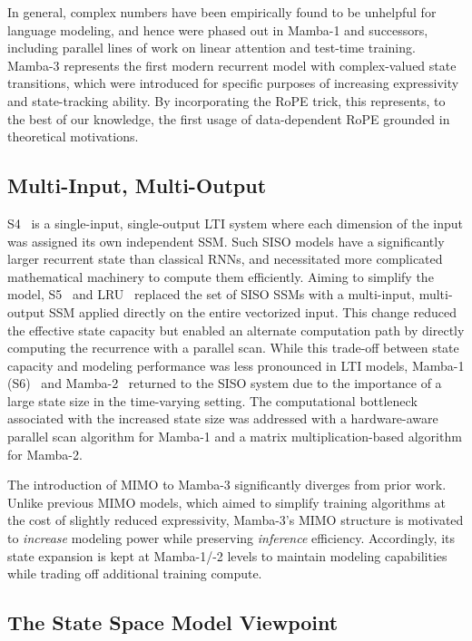 \documentclass{article}
\newcommand{\citep}{\parencite}
\theoremstyle{plain}
\theoremstyle{definition}
\theoremstyle{remark}
\begin{document}
In general, complex numbers have been empirically found to be unhelpful for language modeling, and hence were phased out in Mamba-1 and successors, including parallel lines of work on linear attention and test-time training.
Mamba-3 represents the first modern recurrent model with complex-valued state transitions,
which were introduced for specific purposes of increasing expressivity and state-tracking ability.
By incorporating the RoPE trick, this represents, to the best of our knowledge, the first usage of data-dependent RoPE grounded in theoretical motivations.

\subsection{Multi-Input, Multi-Output} 
S4~\citep{S4} is a single-input, single-output LTI system where each dimension of the input was assigned its own independent SSM.
Such SISO models have a significantly larger recurrent state than classical RNNs, and necessitated more complicated mathematical machinery to compute them efficiently.
Aiming to simplify the model, S5~\citep{S5} and LRU~\citep{LRU} replaced the set of SISO SSMs with a multi-input, multi-output SSM applied directly on the entire vectorized input.
This change reduced the effective state capacity but enabled an alternate computation path by directly computing the recurrence with a parallel scan.
While this trade-off between state capacity and modeling performance was less pronounced in LTI models, Mamba-1 (S6)~\citep{gu2024mambalineartimesequencemodeling} and Mamba-2~\citep{dao2024transformersssmsgeneralizedmodels} returned to the SISO system due to the importance of a large state size in the time-varying setting.
The computational bottleneck associated with the increased state size was addressed with a hardware-aware parallel scan algorithm for Mamba-1 and a matrix multiplication-based algorithm for Mamba-2.

The introduction of MIMO to Mamba-3 significantly diverges from prior work. Unlike previous MIMO models, which aimed to simplify training algorithms at the cost of slightly reduced expressivity,
Mamba-3's MIMO structure is motivated to \emph{increase} modeling power while preserving \emph{inference} efficiency.
Accordingly, its state expansion is kept at Mamba-1/-2 levels to maintain modeling capabilities while trading off additional training compute.

\subsection{The State Space Model Viewpoint}
\end{document}

